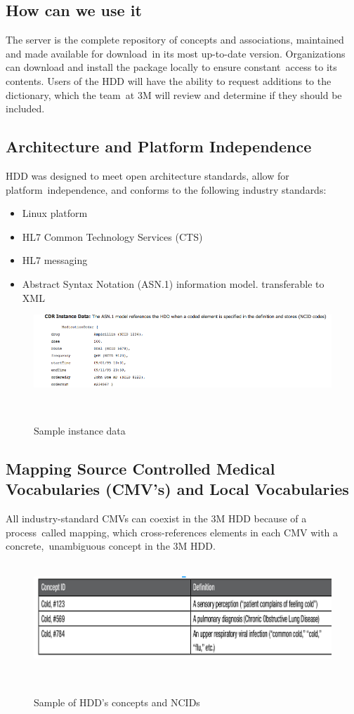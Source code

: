   \subsection{How can we use it}
  The server is the complete repository of concepts and associations, maintained and made available for download\
  in its most up-to-date version. Organizations can download and install the package locally to ensure constant\ 
  access to its contents. Users of the HDD will have the ability to request additions to the dictionary, which the team\
  at 3M will review and determine if they should be included. \citep{_Murphy_2012}\
  
 \subsection{Architecture and Platform Independence}
  HDD was designed to meet open architecture standards, allow for platform\
  independence, and conforms to the following industry standards:\
  \begin{itemize}
    \itemsep0ex
    \item Linux platform\
    \item HL7 Common Technology Services (CTS)\
    \item HL7 messaging\
    \item Abstract Syntax Notation (ASN.1) information model. transferable to XML\
    \citep{_3M_HDD_Product_Overview_2010}\
  \end{itemize}

  \begin{figure}[ht!]
    \label{fig:sid}
    \centering
    \includegraphics[width=\textwidth]{sid.png}
    \caption{Sample instance data}\
    \citep{_3M_HDD_Product_Overview_2010}\
  \end{figure}  
 
  \subsection{Mapping Source Controlled Medical Vocabularies (CMV's) and Local Vocabularies}
  All industry-standard CMVs can coexist in the 3M HDD because of a process\
  called mapping, which cross-references elements in each CMV with a concrete,\
  unambiguous concept in the 3M HDD.\\
  \citep{_3M_HDD_Product_Overview_2010}\

  \begin{figure}[ht!]
    \label{fig:cid}
    \centering
    \includegraphics[scale=0.4]{conceptid.png}
    \caption{Sample of HDD's concepts and NCIDs}\
    \citep{_3M_HDD_Product_Overview_2010}\
  \end{figure}  
